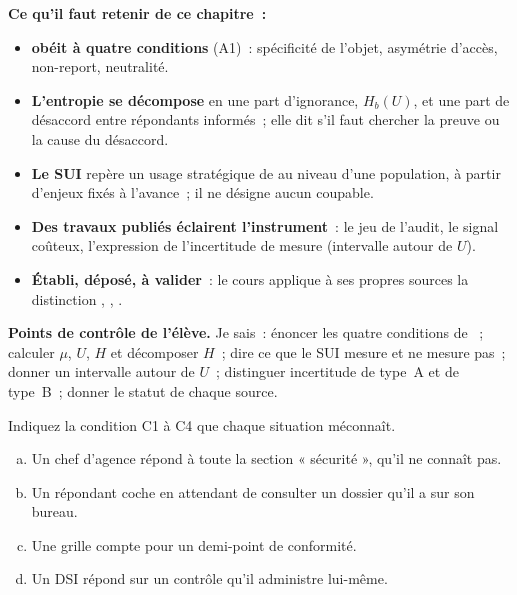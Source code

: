 
\separateur

\begin{boxresume}
\textbf{Ce qu'il faut retenir de ce chapitre~:}
\begin{itemize}
    \item \textbf{\NEK{} obéit à quatre conditions} (A1)~: spécificité de
          l'objet, asymétrie d'accès, non-report, neutralité.
    \item \textbf{L'entropie se décompose} en une part d'ignorance,
          $H_b(U)$, et une part de désaccord entre répondants informés~;
          elle dit s'il faut chercher la preuve ou la cause du désaccord.
    \item \textbf{Le SUI} repère un usage stratégique de \NEK{} au niveau
          d'une population, à partir d'enjeux fixés à l'avance~; il ne
          désigne aucun coupable.
    \item \textbf{Des travaux publiés éclairent l'instrument}~: le jeu de
          l'audit, le signal coûteux, l'expression de l'incertitude de
          mesure (intervalle autour de $U$).
    \item \textbf{Établi, déposé, à valider}~: le cours applique à ses
          propres sources la distinction \OUI{}, \NON{}, \NEK{}.
\end{itemize}
\end{boxresume}

\begin{boxinfo}
\textbf{Points de contrôle de l'élève.} Je sais~: énoncer les quatre
conditions de \NEK{}~; calculer $\mu$, $U$, $H$ et décomposer $H$~; dire ce
que le SUI mesure et ne mesure pas~; donner un intervalle autour de $U$~;
distinguer incertitude de type~A et de type~B~; donner le statut de
chaque source.
\end{boxinfo}

\bigskip

\begin{boxexo}[title={\ding{45}\quad Exercice~31.1. Quelle condition~? \niveaubase}]
Indiquez la condition C1 à C4 que chaque situation méconnaît.
\begin{enumerate}[(a)]
    \item Un chef d'agence répond \NEK{} à toute la section « sécurité »,
          qu'il ne connaît pas.
    \item Un répondant coche \NEK{} en attendant de consulter un dossier
          qu'il a sur son bureau.
    \item Une grille compte \NEK{} pour un demi-point de conformité.
    \item Un DSI répond \NEK{} sur un contrôle qu'il administre lui-même.
\end{enumerate}
\end{boxexo}

